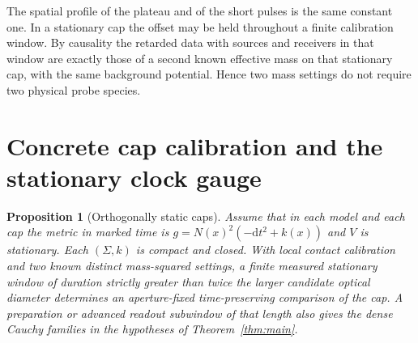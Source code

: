 \documentclass[11pt]{article}
\numberwithin{equation}{section}
\newtheorem{proposition}[theorem]{Proposition}
\newcommand\dd{\mathrm d}
\begin{document}
The spatial profile of the plateau and of the short pulses is the same constant one. In a stationary cap the offset may be held throughout a finite calibration window. By causality the retarded data with sources and receivers in that window are exactly those of a second known effective mass on that stationary cap, with the same background potential. Hence two mass settings do not require two physical probe species.

\section{Concrete cap calibration and the stationary clock gauge}\label{sec:caps}

\begin{proposition}[Orthogonally static caps]\label{prop:static}
Assume that in each model and each cap the metric in marked time is \(g=N(x)^2(-\dd t^2+k(x))\) and \(V\) is stationary. Each \((\Sigma,k)\) is compact and closed. With local contact calibration and two known distinct mass-squared settings, a finite measured stationary window of duration strictly greater than twice the larger candidate optical diameter determines an aperture-fixed time-preserving comparison of the cap. A preparation or advanced readout subwindow of that length also gives the dense Cauchy families in the hypotheses of Theorem~\ref{thm:main}.
\end{proposition}
\end{document}
